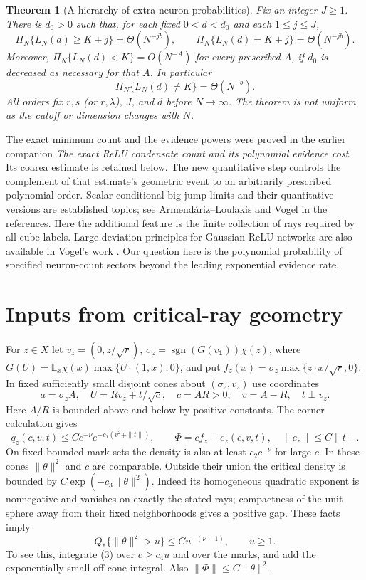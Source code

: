 \documentclass[11pt]{article}
\newtheorem{theorem}{Theorem}\newtheorem{lemma}[theorem]{Lemma}
\newcommand{\E}{\mathbb E}\newcommand{\Pp}{\mathbb P}
\begin{document}
\begin{theorem}[A hierarchy of extra-neuron probabilities]\label{thm:count}
Fix an integer $J\ge1$. There is $d_0>0$ such that, for each fixed
$0<d<d_0$ and each $1\le j\le J$,
\[
 \Pi_N\{L_N(d)\ge K+j\}=\Theta(N^{-jb}),\qquad
 \Pi_N\{L_N(d)=K+j\}=\Theta(N^{-jb}).                 \tag{1}
\]
Moreover, $\Pi_N\{L_N(d)<K\}=O(N^{-A})$ for every prescribed $A$,
if $d_0$ is decreased as necessary for that $A$. In particular
\[
                  \Pi_N\{L_N(d)\ne K\}=\Theta(N^{-b}). \tag{2}
\]
All orders fix $r,s$ (or $r,\lambda$), $J$, and $d$ before $N\to\infty$.
The theorem is not uniform as the cutoff or dimension changes with $N$.
\end{theorem}

The exact minimum count and the evidence powers were proved in the
earlier companion \emph{The exact ReLU condensate count and its polynomial
evidence cost}. Its coarea estimate is retained below. The new quantitative
step controls the complement of that estimate's geometric event to an
arbitrarily prescribed polynomial order. Scalar conditional big-jump
limits and their quantitative versions are established topics; see
Armend\'ariz--Loulakis and Vogel in the references. Here the additional
feature is the finite collection of rays required by all cube labels.
Large-deviation principles for Gaussian ReLU networks are also available
in Vogel's work \cite{VogelNN}. Our question here is the polynomial
probability of specified neuron-count sectors beyond the leading
exponential evidence rate.

\section{Inputs from critical-ray geometry}
For $z\in X$ let $v_z=(0,z/\sqrt r)$,
$\sigma_z=\operatorname{sgn}(G(v_{\mathbf1}))\chi(z)$, where
$G(U)=\E_x\chi(x)\max\{U\cdot(1,x),0\}$, and put
$f_z(x)=\sigma_z\max\{z\cdot x/\sqrt r,0\}$. In fixed sufficiently
small disjoint cones about $(\sigma_z,v_z)$ use coordinates
\[
 a=\sigma_z A,\quad U=Rv_z+t/\sqrt c,\quad
 c=AR>0,\quad v=A-R,\quad t\perp v_z.
\]
Here $A/R$ is bounded above and below by positive constants. The
corner calculation gives
\[
 q_z(c,v,t)\le Cc^{-\nu}e^{-c_1(v^2+\|t\|)},\qquad
 \Phi=cf_z+e_z(c,v,t),\quad \|e_z\|\le C\|t\|.         \tag{3}
\]
On fixed bounded mark sets the density is also at least $c_2c^{-\nu}$
for large $c$. In these cones $\|\theta\|^2$ and $c$ are comparable.
Outside their union the critical density is bounded by
$C\exp(-c_3\|\theta\|^2)$. Indeed its homogeneous quadratic exponent
is nonnegative and vanishes on exactly the stated rays; compactness of
the unit sphere away from their fixed neighborhoods gives a positive gap.
These facts imply
\[
 Q_*\{\|\theta\|^2>u\}\le Cu^{-(\nu-1)},\qquad u\ge1. \tag{4}
\]
To see this, integrate (3) over $c\ge c_4u$ and over the marks, and add
the exponentially small off-cone integral. Also $\|\Phi\|\le C\|\theta\|^2$.
\end{document}
